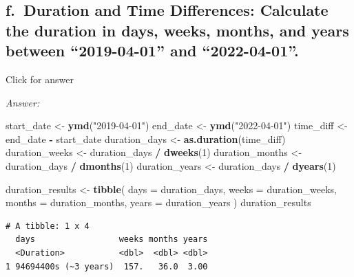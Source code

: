\documentclass[
]{book}
\newenvironment{Shaded}{\begin{snugshade}}{\end{snugshade}}
\newcommand{\AttributeTok}[1]{\textcolor[rgb]{0.13,0.29,0.53}{#1}}
\newcommand{\DecValTok}[1]{\textcolor[rgb]{0.00,0.00,0.81}{#1}}
\newcommand{\FunctionTok}[1]{\textcolor[rgb]{0.13,0.29,0.53}{\textbf{#1}}}
\newcommand{\NormalTok}[1]{#1}
\newcommand{\OtherTok}[1]{\textcolor[rgb]{0.56,0.35,0.01}{#1}}
\newcommand{\SpecialCharTok}[1]{\textcolor[rgb]{0.81,0.36,0.00}{\textbf{#1}}}
\newcommand{\StringTok}[1]{\textcolor[rgb]{0.31,0.60,0.02}{#1}}
\begin{document}
\hypertarget{f.-duration-and-time-differences-calculate-the-duration-in-days-weeks-months-and-years-between-2019-04-01-and-2022-04-01.}{%
\subsection{f.~Duration and Time Differences: Calculate the duration in days, weeks, months, and years between ``2019-04-01'' and ``2022-04-01''.}\label{f.-duration-and-time-differences-calculate-the-duration-in-days-weeks-months-and-years-between-2019-04-01-and-2022-04-01.}}

Click for answer

\emph{Answer:}

\begin{Shaded}
\begin{Highlighting}[]
\NormalTok{start\_date }\OtherTok{\textless{}{-}} \FunctionTok{ymd}\NormalTok{(}\StringTok{"2019{-}04{-}01"}\NormalTok{)}
\NormalTok{end\_date }\OtherTok{\textless{}{-}} \FunctionTok{ymd}\NormalTok{(}\StringTok{"2022{-}04{-}01"}\NormalTok{)}
\NormalTok{time\_diff }\OtherTok{\textless{}{-}}\NormalTok{ end\_date }\SpecialCharTok{{-}}\NormalTok{ start\_date}
\NormalTok{duration\_days }\OtherTok{\textless{}{-}} \FunctionTok{as.duration}\NormalTok{(time\_diff)}
\NormalTok{duration\_weeks }\OtherTok{\textless{}{-}}\NormalTok{ duration\_days }\SpecialCharTok{/} \FunctionTok{dweeks}\NormalTok{(}\DecValTok{1}\NormalTok{)}
\NormalTok{duration\_months }\OtherTok{\textless{}{-}}\NormalTok{ duration\_days }\SpecialCharTok{/} \FunctionTok{dmonths}\NormalTok{(}\DecValTok{1}\NormalTok{)}
\NormalTok{duration\_years }\OtherTok{\textless{}{-}}\NormalTok{ duration\_days }\SpecialCharTok{/} \FunctionTok{dyears}\NormalTok{(}\DecValTok{1}\NormalTok{)}

\NormalTok{duration\_results }\OtherTok{\textless{}{-}} \FunctionTok{tibble}\NormalTok{(}
  \AttributeTok{days =}\NormalTok{ duration\_days,}
  \AttributeTok{weeks =}\NormalTok{ duration\_weeks,}
  \AttributeTok{months =}\NormalTok{ duration\_months,}
  \AttributeTok{years =}\NormalTok{ duration\_years}
\NormalTok{)}
\NormalTok{duration\_results}
\end{Highlighting}
\end{Shaded}

\begin{verbatim}
# A tibble: 1 x 4
  days                 weeks months years
  <Duration>           <dbl>  <dbl> <dbl>
1 94694400s (~3 years)  157.   36.0  3.00
\end{verbatim}

  
\end{document}
